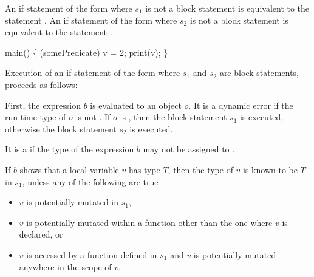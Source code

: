 \documentclass[makeidx]{article}
\begin{document}
{\LMHash{}%
An if statement of the form
where $s_1$ is not a block statement is equivalent to the statement
.
An if statement of the form
where $s_2$ is not a block statement is equivalent to the statement
.


\begin{dartCode}
\VOID{} main() \{
  \IF{} (somePredicate)
    \VAR{} v = 2;
  print(v);
\}
\end{dartCode}


\LMHash{}%
Execution of an if statement of the form
where $s_1$ and $s_2$ are block statements,
proceeds as follows:

\LMHash{}%
First, the expression $b$ is evaluated to an object $o$.
It is a dynamic error if the run-time type of $o$ is not .
If $o$ is \TRUE, then the block statement $s_1$ is executed,
otherwise the block statement $s_2$ is executed.

\LMHash{}%
It is a  if the type of the expression $b$
may not be assigned to .

\LMHash{}%
If $b$ shows that a local variable $v$ has type $T$,
then the type of $v$ is known to be $T$ in $s_1$,
unless any of the following are true
\begin{itemize}
\item $v$ is potentially mutated in $s_1$,
\item $v$ is potentially mutated within a function other
  than the one where $v$ is declared, or
\item $v$ is accessed by a function defined in $s_1$ and
  $v$ is potentially mutated anywhere in the scope of $v$.
\end{itemize}

}
\end{document}
